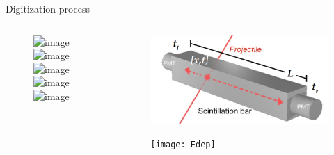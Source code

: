 \documentclass[compress, 13pt, aspectratio=169]{beamer}
\begin{document}
\begin{frame}{Digitization process}
    \begin{columns}
        \begin{column}{0.5\textwidth}
            \begin{figure}[t]
                \includegraphics<1>[keepaspectratio, height = 0.8\textheight]{digiFlow/digiFlow.001.png}%
                \includegraphics<2>[keepaspectratio, height = 0.8\textheight]{digiFlow/digiFlow.002.png}%
                \includegraphics<3>[keepaspectratio, height = 0.8\textheight]{digiFlow/digiFlow.003.png}%
                \includegraphics<4>[keepaspectratio, height = 0.8\textheight]{digiFlow/digiFlow.005.png}%
                \includegraphics<5>[keepaspectratio, height = 0.8\textheight]{digiFlow/digiFlow.005.png}%
            \end{figure}
        \end{column}
        \begin{column}{0.5\textwidth}
            \vspace*{-0.5cm}
            \begin{figure}[t]
                \includegraphics[keepaspectratio, height = 0.3\textheight]{Bar}%
            \end{figure}
            \vspace*{-0.5cm}
            {
            \begin{figure}[t]
                \texttt{[image: Edep]}%
            \end{figure}
        }
        \end{column}
    \end{columns}
\end{frame}
\end{document}
